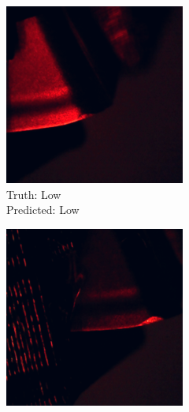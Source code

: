 \begin{figure}[hbtp]
\begin{subfigure}{.24\textwidth}
			\includegraphics[width=\linewidth]{fig/results/wandb/spaghetti_dataset/images/media_images_Examples_r_172_p2_t2.png}
			\caption{Truth: Low\\Predicted: Low}
		\end{subfigure}
		\hspace*{\fill}
		\begin{subfigure}{.24\textwidth}
			\centering
			\includegraphics[width=\linewidth]{fig/results/wandb/spaghetti_dataset/images/media_images_Examples_r_128_p0_t2.png}

\end{subfigure}
\end{figure}
